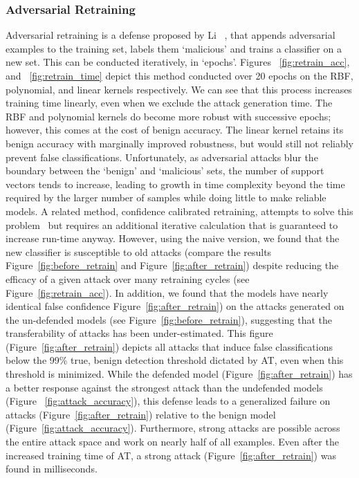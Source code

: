 \documentclass[fonts]{icst}
\begin{document}
\subsubsection{Adversarial Retraining}
Adversarial retraining is a defense proposed by  Li ~\cite{li2016general}, that appends adversarial examples to the training set, labels them `malicious' and trains a classifier on a new set.
This can be conducted iteratively, in `epochs'.
Figures ~\ref{fig:retrain_acc}, and ~\ref{fig:retrain_time} depict this method conducted over 20 epochs on the RBF, polynomial, and linear kernels respectively.
We can see that this process increases training time linearly, even when we exclude the attack generation time.
The RBF and polynomial kernels do become more robust with successive epochs; however, this comes at the cost of benign accuracy.
The linear kernel retains its benign accuracy with marginally improved robustness, but would still not reliably prevent false classifications.
Unfortunately, as adversarial attacks blur the boundary between the `benign' and `malicious' sets, the number of support vectors tends to increase, leading to growth in time complexity beyond the time required by the larger number of samples while doing little to make reliable models.
A related method, confidence calibrated retraining, attempts to solve this problem~\cite{croce2020reliable} but requires an additional iterative calculation that is guaranteed to increase run-time anyway.
However, using the naive version, we found that the new classifier is susceptible to old attacks (compare the results Figure~\ref{fig:before_retrain} and Figure~\ref{fig:after_retrain}) despite reducing the efficacy of a given attack over many retraining cycles (see Figure~\ref{fig:retrain_acc}).
In addition, we found that the models have nearly identical false confidence Figure~\ref{fig:after_retrain}) on the attacks generated on the un-defended models (see Figure~\ref{fig:before_retrain}), suggesting that the transferability of attacks has been under-estimated.
This figure (Figure~\ref{fig:after_retrain}) depicts all attacks that induce false classifications below the 99\% true, benign detection threshold dictated by AT, even when this threshold is minimized.
While the defended model (Figure~\ref{fig:after_retrain}) has a better response against the strongest attack  than the undefended models (Figure ~\ref{fig:attack_accuracy}), this defense leads to a generalized failure on attacks (Figure~\ref{fig:after_retrain}) relative to the benign model (Figure~\ref{fig:attack_accuracy}).
Furthermore, strong attacks are possible across the entire attack space and work on nearly half of all examples.
Even after the increased training time of AT, a strong attack  (Figure~\ref{fig:after_retrain}) was found in milliseconds.
\end{document}
